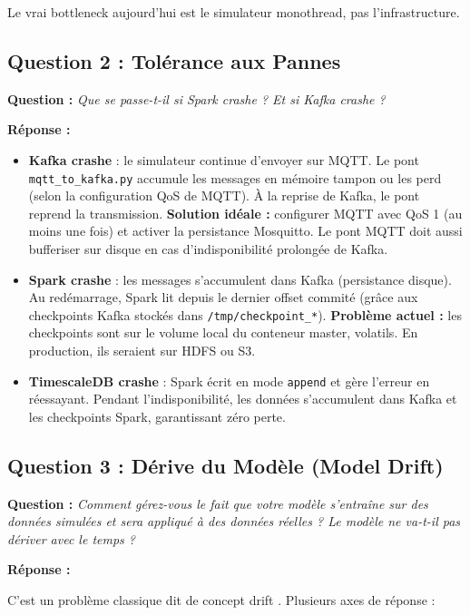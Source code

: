\documentclass[11pt,a4paper]{article}
\begin{document}
Le vrai bottleneck aujourd'hui est le simulateur monothread, pas l'infrastructure.

\subsection{Question 2 : Tolérance aux Pannes}

\textbf{Question :} \textit{Que se passe-t-il si Spark crashe ? Et si Kafka crashe ?}

\textbf{Réponse :}

\begin{itemize}
    \item \textbf{Kafka crashe} : le simulateur continue d'envoyer sur MQTT. Le pont \texttt{mqtt\_to\_kafka.py} accumule les messages en mémoire tampon ou les perd (selon la configuration QoS de MQTT). À la reprise de Kafka, le pont reprend la transmission. \textbf{Solution idéale :} configurer MQTT avec QoS 1 (au moins une fois) et activer la persistance Mosquitto. Le pont MQTT doit aussi bufferiser sur disque en cas d'indisponibilité prolongée de Kafka.

    \item \textbf{Spark crashe} : les messages s'accumulent dans Kafka (persistance disque). Au redémarrage, Spark lit depuis le dernier offset commité (grâce aux checkpoints Kafka stockés dans \texttt{/tmp/checkpoint\_*}). \textbf{Problème actuel :} les checkpoints sont sur le volume local du conteneur master, volatils. En production, ils seraient sur HDFS ou S3.

    \item \textbf{TimescaleDB crashe} : Spark écrit en mode \texttt{append} et gère l'erreur en réessayant. Pendant l'indisponibilité, les données s'accumulent dans Kafka et les checkpoints Spark, garantissant zéro perte.
\end{itemize}

\subsection{Question 3 : Dérive du Modèle (Model Drift)}

\textbf{Question :} \textit{Comment gérez-vous le fait que votre modèle s'entraîne sur des données simulées et sera appliqué à des données réelles ? Le modèle ne va-t-il pas dériver avec le temps ?}

\textbf{Réponse :}

C'est un problème classique dit de \og concept drift \fg. Plusieurs axes de réponse :
\end{document}

